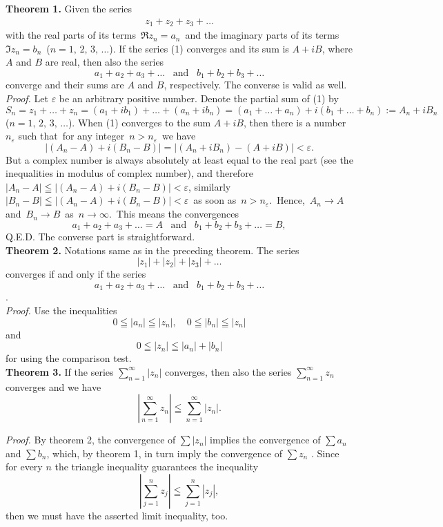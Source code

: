 \documentclass[12pt]{article}
\theoremstyle{definition}
\begin{document}

\textbf{Theorem 1.} Given the series
\begin{align}
      z_1+z_2+z_3+\ldots
\end{align}
with the real parts of its terms\, $\Re{z_n} = a_n$\, and the imaginary parts of its terms\, $\Im{z_n} = b_n$\, ($n = 1,\,2,\,3,\,\ldots$).  If the series (1) converges and its sum is $A+iB$, where $A$ and $B$ are real, then also the series
$$a_1+a_2+a_3+\ldots\;\;\;\mbox{and}\;\;\;b_1+b_2+b_3+\ldots$$
converge and their sums are $A$ and $B$, respectively.  The converse is valid as well.\\

{\em Proof.}  Let $\varepsilon$ be an arbitrary positive number.  Denote the partial sum of (1) by 
$$S_n = z_1+\ldots+z_n = (a_1+ib_1)+\ldots+(a_n+ib_n) = (a_1+\ldots+a_n)+i(b_1+\ldots+b_n) := A_n+iB_n$$
($n = 1,\,2,\,3,\,\ldots$).  When (1) converges to the sum $A+iB$, then there is a number $n_\varepsilon$ such that\, for any integer \,$n > n_\varepsilon$\, we have
$$|(A_n-A)+i(B_n-B)| = |(A_n+iB_n)-(A+iB)| < \varepsilon.$$
But a complex number is always absolutely at least equal to the real part (see the inequalities in modulus of complex number), and therefore\, $|A_n-A| \leqq |(A_n-A)+i(B_n-B)| < \varepsilon$, similarly\, $|B_n-B| \leqq |(A_n-A)+i(B_n-B)| < \varepsilon$\, as soon as\, $n > n_\varepsilon$.\, Hence,\, $A_n \to A$\, and\, $B_n \to B$\, as\, $n \to \infty$.\, This means the convergences
$$a_1+a_2+a_3+\ldots = A\;\;\;\mbox{and}\;\;\;b_1+b_2+b_3+\ldots = B,$$
Q.E.D.  The converse part is straightforward.\\

\textbf{Theorem 2.}  Notations same as in the preceding theorem.  The series
$$|z_1|+|z_2|+|z_3|+\ldots$$
converges if and only if the series
$$a_1+a_2+a_3+\ldots\;\;\;\mbox{and}\;\;\;b_1+b_2+b_3+\ldots$$
.\\

{\em Proof.} Use the inequalities
$$0 \leqq |a_n| \leqq |z_n|,\quad 0 \leqq |b_n| \leqq |z_n|$$
and
$$0 \leqq |z_n| \leqq |a_n|+|b_n|$$
for using the comparison test.\\

\textbf{Theorem 3.}  If the series $\displaystyle\sum_{n=1}^\infty|z_n|$ converges, then also the series 
$\displaystyle\sum_{n=1}^\infty z_n$ converges and we have
$$\left|\sum_{n=1}^\infty z_n\right| \leqq \sum_{n=1}^\infty|z_n|.$$

{\em Proof.}  By theorem 2, the convergence of $\sum|z_n|$ implies the convergence of $\sum a_n$ and $\sum b_n$, which, by theorem 1, in turn imply the convergence of $\sum z_n$ .  Since for every $n$ the triangle inequality guarantees the inequality
$$\left|\sum_{j=1}^n z_j\right| \leqq \sum_{j=1}^n|z_j|,$$
then we must have the asserted limit inequality, too.


\end{document}
